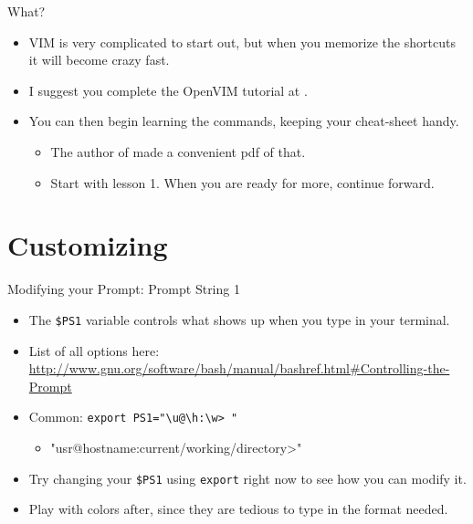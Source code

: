 \begin{frame}[fragile]{What?}
  \begin{itemize}[<+- | alert@+>]
    \item VIM is very complicated to start out, but when you memorize the shortcuts it will become crazy fast.
    \item I suggest you complete the OpenVIM tutorial at \cite{vimtutorial}.
    \item You can then begin learning the commands, keeping your cheat-sheet\cite{gvim-cheat} handy.
    \begin{itemize}[<+- | alert@+>]
      \item The author of \cite{single-pdf} made a convenient pdf of that.
      \item Start with lesson 1.  When you are ready for more, continue forward.
    \end{itemize}
  \end{itemize}
\end{frame}

%

%
\section{Customizing}
\label{sec:customizing}

\begin{frame}[fragile]{Modifying your Prompt: Prompt String 1}
  \begin{itemize}[<+- | alert@+>]
    \item The \texttt{\$PS1} variable controls what shows up when you type in your terminal.
    \item List of all options here: {\tiny \href{http://www.gnu.org/software/bash/manual/bashref.html#Controlling-the-Prompt}{http://www.gnu.org/software/bash/manual/bashref.html\#Controlling-the-Prompt}}
    \item Common: \texttt{export PS1="\textbackslash u@\textbackslash h:\textbackslash w> "}
    \begin{itemize}[<+- | alert@+>]
      \item "usr@hostname:current/working/directory>"
    \end{itemize}
    \item Try changing your \texttt{\$PS1} using \texttt{export} right now to see how you can modify it.
    \item Play with colors after, since they are tedious to type in the format needed.
  \end{itemize}
\end{frame}

